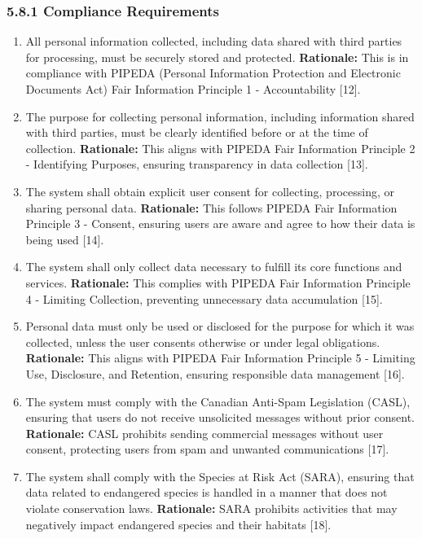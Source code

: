 \documentclass[]{article}
\begin{document}
\subsubsection*{5.8.1 Compliance Requirements}
\label{ssub:compliance_requirements}
\begin{enumerate}[{LR-COMP}1. ]
	\item All personal information collected, including data shared with third parties for processing, must be securely stored and protected. 
    \newline \textbf{Rationale:} This is in compliance with PIPEDA (Personal Information Protection and Electronic Documents Act) Fair Information Principle 1 - Accountability [12].

    \item The purpose for collecting personal information, including information shared with third parties, must be clearly identified before or at the time of collection. 
    \newline \textbf{Rationale:} This aligns with PIPEDA Fair Information Principle 2 - Identifying Purposes, ensuring transparency in data collection [13].

    \item The system shall obtain explicit user consent for collecting, processing, or sharing personal data. 
    \newline \textbf{Rationale:} This follows PIPEDA Fair Information Principle 3 - Consent, ensuring users are aware and agree to how their data is being used [14].

    \item The system shall only collect data necessary to fulfill its core functions and services. 
    \newline \textbf{Rationale:} This complies with PIPEDA Fair Information Principle 4 - Limiting Collection, preventing unnecessary data accumulation [15].

    \item Personal data must only be used or disclosed for the purpose for which it was collected, unless the user consents otherwise or under legal obligations. 
    \newline \textbf{Rationale:} This aligns with PIPEDA Fair Information Principle 5 - Limiting Use, Disclosure, and Retention, ensuring responsible data management [16].

    \item The system must comply with the Canadian Anti-Spam Legislation (CASL), ensuring that users do not receive unsolicited messages without prior consent. 
    \newline \textbf{Rationale:} CASL prohibits sending commercial messages without user consent, protecting users from spam and unwanted communications [17].

    \item The system shall comply with the Species at Risk Act (SARA), ensuring that data related to endangered species is handled in a manner that does not violate conservation laws. 
    \newline \textbf{Rationale:} SARA prohibits activities that may negatively impact endangered species and their habitats [18].
 
\end{enumerate}
\end{document}
